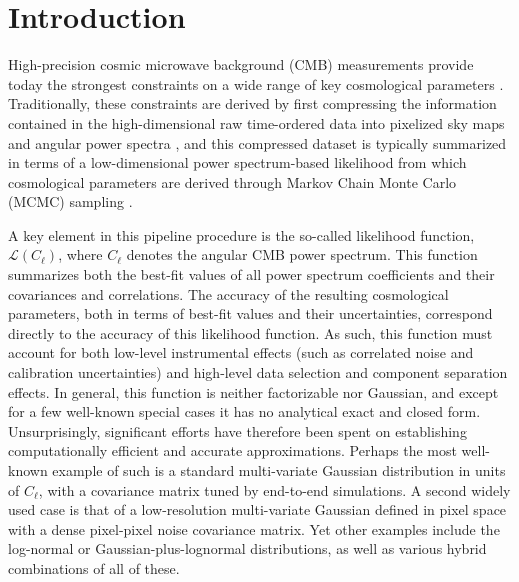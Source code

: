 \documentclass[twocolumn]{../common/aa}
\begin{document}

\maketitle

\tableofcontents




\section{Introduction}
\label{sec:introduction}

High-precision cosmic microwave background (CMB) measurements provide today the strongest constraints on a wide range of key cosmological parameters \citep[e.g.,][]{planck2016-l06}. Traditionally, these constraints are derived by first compressing the information contained in the high-dimensional raw time-ordered data into pixelized sky maps and angular power spectra \citep[e.g.,][]{bennett2012,planck2016-l02,planck2016-l03}, and this compressed dataset is typically summarized in terms of a low-dimensional power spectrum-based likelihood from which cosmological parameters are derived through Markov Chain Monte Carlo (MCMC) sampling \citep{cosmomc,planck2016-l05}.

A key element in this pipeline procedure is the so-called likelihood function, $\mathcal{L}(C_{\ell})$, where $C_{\ell}$ denotes the angular CMB power spectrum. This function summarizes both the best-fit values of all power spectrum coefficients and their covariances and correlations. The accuracy of the resulting cosmological parameters, both in terms of best-fit values and their uncertainties, correspond directly to the accuracy of this likelihood function. As such, this function must account for both low-level instrumental effects (such as correlated noise and calibration uncertainties) and high-level data selection and component separation effects. In general, this function is neither factorizable nor Gaussian, and except for a few well-known special cases it has no analytical exact and closed form. Unsurprisingly, significant efforts have therefore been spent on establishing computationally efficient and accurate approximations. Perhaps the most well-known example of such is a standard multi-variate Gaussian distribution in units of $C_{\ell}$, with a covariance matrix tuned by end-to-end simulations. A second widely used case is that of a low-resolution multi-variate Gaussian defined in pixel space with a dense pixel-pixel noise covariance matrix. Yet other examples include the log-normal or Gaussian-plus-lognormal distributions, as well as various hybrid combinations of all of these. 
\end{document}
